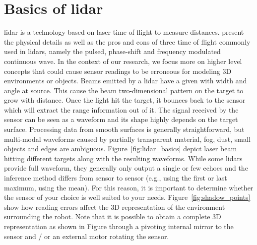 \section{Basics of \gls{lidar}}
\label{sec:chap_lidar_basics}

\gls{lidar} is a technology based on laser time of flight to measure distances. \citet{lidar_basics} present the physical details as well as the pros and cons of three time of flight commonly used in \gls{lidar}s, namely the pulsed, phase-shift and frequency modulated continuous wave. In the context of our research, we focus more on higher level concepts that could cause sensor readings to be erroneous for modeling 3D environments or objects. Beams emitted by a \gls{lidar} have a given with width and angle at source. This cause the beam two-dimensional pattern on the target to grow with distance. Once the light hit the target, it bounces back to the sensor which will extract the range information out of it. The signal received by the sensor can be seen as a waveform and its shape highly depends on the target surface. Processing data from smooth surfaces is generally straightforward, but multi-modal waveforms caused by partially transparent material, fog, dust, small objects and edges are ambiguous. Figure~\ref{fig:lidar_basics} depict laser beam hitting different targets along with the resulting waveforms. While some \gls{lidar}s provide full waveform, they generally only output a single or few echoes and the inference method differs from sensor to sensor (e.g., using the first or last maximum, using the mean). For this reason, it is important to determine whether the sensor of your choice is well suited to your needs. Figure~\ref{fig:shadow_points} show how reading errors affect the 3D representation of the environment surrounding the robot. Note that it is possible to obtain a complete 3D representation as shown in Figure through a pivoting internal mirror to the sensor and / or an external motor rotating the sensor.


